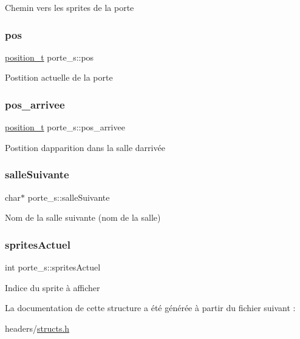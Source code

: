 Chemin vers les sprites de la porte \mbox{\label{structporte__s_a9e3c1bbfc207fb5ae26ed3c348ae9602}} 
\subsubsection{\texorpdfstring{pos}{pos}}
{\footnotesize\ttfamily \hyperlink{structposition__s}{position\+\_\+t} porte\+\_\+s\+::pos}

Postition actuelle de la porte \mbox{\label{structporte__s_a5f0b093b4c08255187a3dd261ff9e638}} 
\subsubsection{\texorpdfstring{pos\+\_\+arrivee}{pos\_arrivee}}
{\footnotesize\ttfamily \hyperlink{structposition__s}{position\+\_\+t} porte\+\_\+s\+::pos\+\_\+arrivee}

Postition d\textquotesingle{}apparition dans la salle d\textquotesingle{}arrivée \mbox{\label{structporte__s_ae89eb735de3e232b85236a603bf004d4}} 
\subsubsection{\texorpdfstring{salle\+Suivante}{salleSuivante}}
{\footnotesize\ttfamily char$\ast$ porte\+\_\+s\+::salle\+Suivante}

Nom de la salle suivante (nom de la salle) \mbox{\label{structporte__s_aac069c5b47ed31b2716a3571f0a069e6}} 
\subsubsection{\texorpdfstring{sprites\+Actuel}{spritesActuel}}
{\footnotesize\ttfamily int porte\+\_\+s\+::sprites\+Actuel}

Indice du sprite à afficher 

La documentation de cette structure a été générée à partir du fichier suivant \+:\begin{DoxyCompactItemize}
\item 
headers/\hyperlink{structs_8h}{structs.\+h}\end{DoxyCompactItemize}
